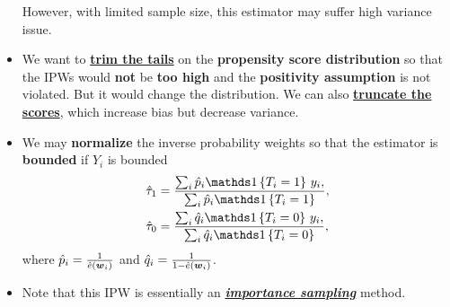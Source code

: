 \documentclass[11pt]{article}
\begin{document}
\begin{itemize}
However, with limited sample size, this estimator may suffer high variance issue.

\item We want to \underline{\textbf{trim the tails}} on the \textbf{propensity score distribution} so that the IPWs would \textbf{not} be \textbf{too high} and the \textbf{positivity assumption} is not violated. But it would change the distribution.  We can also \underline{\textbf{truncate the scores}}, which increase bias but decrease variance.

\item We may \textbf{normalize} the inverse probability weights so that the estimator is \textbf{bounded} if $Y_i$ is bounded
\begin{align*}
\hat{\tau}_1 &= \frac{\sum_{i}\hat{p}_i\ind{T_i=1}\,y_i,}{\sum_{i}\hat{p}_i\ind{T_i=1} }, \\
\hat{\tau}_0 &= \frac{\sum_{i}\hat{q}_i\ind{T_i=0}\,y_i,}{\sum_{i}\hat{q}_i\ind{T_i=0} },
\end{align*} where $\hat{p}_i = \frac{1}{\hat{e}(\boldsymbol{w}_i)}$ and $\hat{q}_i =  \frac{1}{1- \hat{e}(\boldsymbol{w}_i)}$.

\item Note that this IPW is essentially an \underline{\textbf{\emph{importance sampling}}} method.
\end{itemize}
\end{document}
